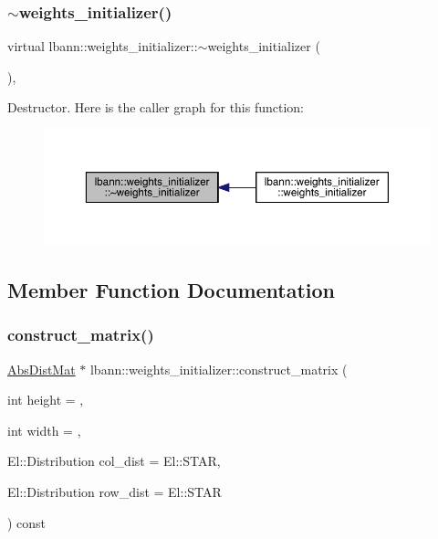 \subsubsection{\texorpdfstring{$\sim$weights\+\_\+initializer()}{~weights\_initializer()}}
{\footnotesize\ttfamily virtual lbann\+::weights\+\_\+initializer\+::$\sim$weights\+\_\+initializer (\begin{DoxyParamCaption}{ }\end{DoxyParamCaption})\hspace{0.3cm}{\ttfamily [virtual]}, {\ttfamily [default]}}

Destructor. Here is the caller graph for this function\+:\nopagebreak
\begin{figure}[H]
\begin{center}
\leavevmode
\includegraphics[width=350pt]{classlbann_1_1weights__initializer_a9fba102d897402d3df37776d8aa99549_icgraph}
\end{center}
\end{figure}


\subsection{Member Function Documentation}
\mbox{\label{classlbann_1_1weights__initializer_a693fd517e4162029eafdfdee537c7066}} 
\subsubsection{\texorpdfstring{construct\+\_\+matrix()}{construct\_matrix()}}
{\footnotesize\ttfamily \hyperlink{base_8hpp_a9a697a504ae84010e7439ffec862b470}{Abs\+Dist\+Mat} $\ast$ lbann\+::weights\+\_\+initializer\+::construct\+\_\+matrix (\begin{DoxyParamCaption}\item[{int}]{height = {},  }\item[{int}]{width = {},  }\item[{El\+::\+Distribution}]{col\+\_\+dist = {\ttfamily El\+:\+:STAR},  }\item[{El\+::\+Distribution}]{row\+\_\+dist = {\ttfamily El\+:\+:STAR} }\end{DoxyParamCaption}) const}

